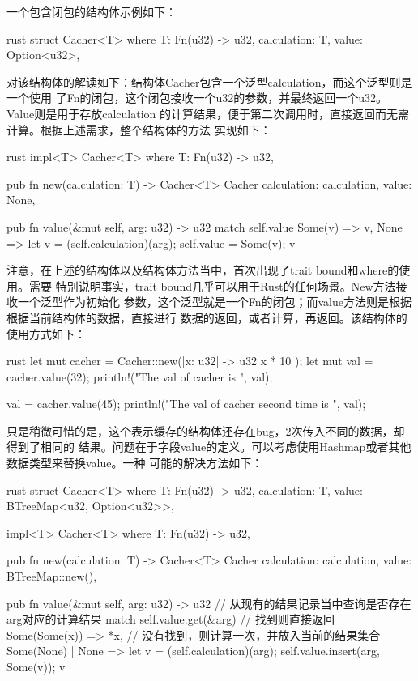 一个包含闭包的结构体示例如下：
\begin{code-block}{rust}
struct Cacher<T>
where
    T: Fn(u32) -> u32,
{
    calculation: T,
    value: Option<u32>,
}
\end{code-block}
对该结构体的解读如下：结构体Cacher包含一个泛型calculation，而这个泛型则是一个使用
了Fn的闭包，这个闭包接收一个u32的参数，并最终返回一个u32。Value则是用于存放calculation
的计算结果，便于第二次调用时，直接返回而无需计算。根据上述需求，整个结构体的方法
实现如下：
\begin{code-block}{rust}
impl<T> Cacher<T>
where
    T: Fn(u32) -> u32,
{
    pub fn new(calculation: T) -> Cacher<T> {
        Cacher {
            calculation: calculation,
            value: None,
        }
    }

    pub fn value(&mut self, arg: u32) -> u32 {
        match self.value {
            Some(v) => v,
            None => {
                let v = (self.calculation)(arg);
                self.value = Some(v);
                v
            }
        }
    }
}
\end{code-block}
注意，在上述的结构体以及结构体方法当中，首次出现了trait bound和where的使用。需要
特别说明事实，trait bound几乎可以用于Rust的任何场景。New方法接收一个泛型作为初始化
参数，这个泛型就是一个Fn的闭包；而value方法则是根据根据当前结构体的数据，直接进行
数据的返回，或者计算，再返回。该结构体的使用方式如下：
\begin{code-block}{rust}
let mut cacher = Cacher::new(|x: u32| -> u32 { x * 10 });
let mut val = cacher.value(32);
println!("The val of cacher is {}", val);

val = cacher.value(45);
println!("The val of cacher second time is {}", val);
\end{code-block}
只是稍微可惜的是，这个表示缓存的结构体还存在bug，2次传入不同的数据，却得到了相同的
结果。问题在于字段value的定义。可以考虑使用Hashmap或者其他数据类型来替换value。一种
可能的解决方法如下：
\begin{code-block}{rust}
struct Cacher<T>
where
    T: Fn(u32) -> u32,
{
    calculation: T,
    value: BTreeMap<u32, Option<u32>>,
}

impl<T> Cacher<T>
where
    T: Fn(u32) -> u32,
{
    pub fn new(calculation: T) -> Cacher<T> {
        Cacher {
            calculation: calculation,
            value: BTreeMap::new(),
        }
    }

    pub fn value(&mut self, arg: u32) -> u32 {
        // 从现有的结果记录当中查询是否存在arg对应的计算结果
        match self.value.get(&arg) {
            // 找到则直接返回
            Some(Some(x)) => *x,
            // 没有找到，则计算一次，并放入当前的结果集合
            Some(None) | None => {
                let v = (self.calculation)(arg);
                self.value.insert(arg, Some(v));
                v
            }
        }
    }
}
\end{code-block}

